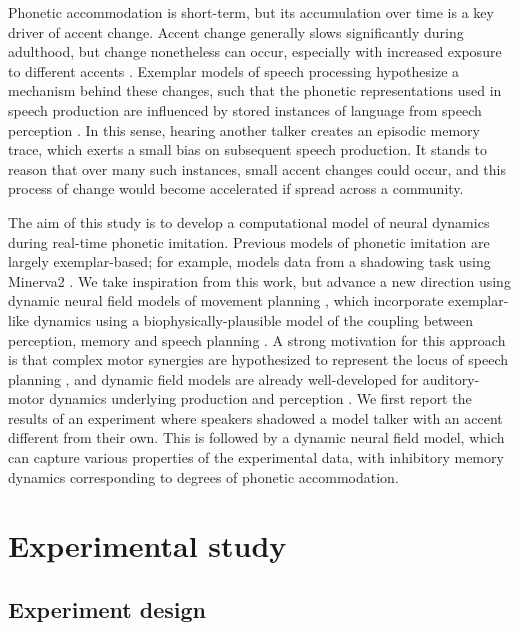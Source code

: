 \documentclass[10pt,letterpaper]{article}
\begin{document}
Phonetic accommodation is short-term, but its accumulation over time is a key driver of accent change. Accent change generally slows significantly during adulthood, but change nonetheless can occur, especially with increased exposure to different accents \citep{evans-iverson2007, harrington-etal2019}. Exemplar models of speech processing hypothesize a mechanism behind these changes, such that the phonetic representations used in speech production are influenced by stored instances of language from speech perception \citep{gubian-etal2023, johnson2007, pierrehumbert2002}. In this sense, hearing another talker creates an episodic memory trace, which exerts a small bias on subsequent speech production. It stands to reason that over many such instances, small accent changes could occur, and this process of change would become accelerated if spread across a community.

The aim of this study is to develop a computational model of neural dynamics during real-time phonetic imitation. Previous models of phonetic imitation are largely exemplar-based; for example, \citet{goldinger1998} models data from a shadowing task using Minerva2 \citep{hintzman1984, hintzman1986}. We take inspiration from this work, but advance a new direction using dynamic neural field models of movement planning \citep{schoener-etal2016}, which incorporate exemplar-like dynamics using a biophysically-plausible model of the coupling between perception, memory and speech planning \citep{gafos2006, tilsen2009b}. A strong motivation for this approach is that complex motor synergies are hypothesized to represent the locus of speech planning \citep{fowler1980, kelso-etal1986}, and dynamic field models are already well-developed for auditory-motor dynamics underlying production and perception \citep{gafos2006, roon-gafos2016, stern-shaw2023, tilsen2019, tilsen2022}. We first report the results of an experiment where speakers shadowed a model talker with an accent different from their own. This is followed by a dynamic neural field model, which can capture various properties of the experimental data, with inhibitory memory dynamics corresponding to degrees of phonetic accommodation.



\section{Experimental study}
\label{sec:experiment}

\subsection{Experiment design}
\end{document}
